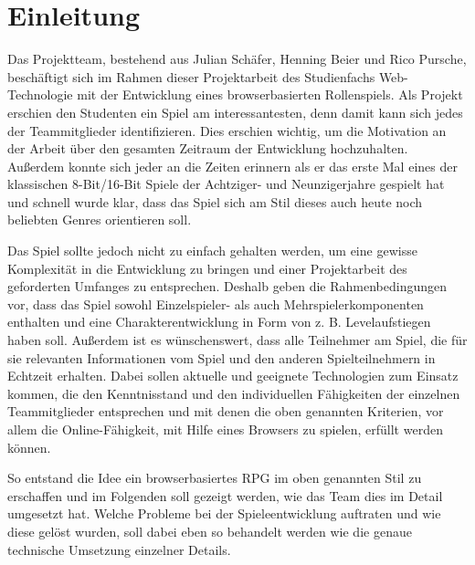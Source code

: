 

\section{Einleitung}

Das Projektteam, bestehend aus Julian Schäfer, Henning Beier und Rico Pursche, beschäftigt sich im Rahmen dieser Projektarbeit des Studienfachs Web-Technologie mit der Entwicklung eines browserbasierten Rollenspiels. 
Als Projekt erschien den Studenten ein Spiel am interessantesten, denn damit kann sich jedes der Teammitglieder identifizieren. Dies erschien wichtig, um die Motivation an der Arbeit über den gesamten Zeitraum der Entwicklung hochzuhalten. Außerdem konnte sich jeder an die Zeiten erinnern als er das erste Mal eines der klassischen 8-Bit/16-Bit Spiele der Achtziger- und Neunzigerjahre gespielt hat und schnell wurde klar, dass das Spiel sich am Stil dieses auch heute noch beliebten Genres orientieren soll.

Das Spiel sollte jedoch nicht zu einfach gehalten werden, um eine gewisse Komplexität in die Entwicklung zu bringen und einer Projektarbeit des geforderten Umfanges zu entsprechen. Deshalb geben die Rahmenbedingungen vor, dass das Spiel sowohl Einzelspieler- als auch Mehrspielerkomponenten enthalten und eine Charakterentwicklung in Form von z. B. Levelaufstiegen haben soll. Außerdem ist es wünschenswert, dass alle Teilnehmer am Spiel, die für sie relevanten Informationen vom Spiel und den anderen Spielteilnehmern in Echtzeit erhalten. Dabei sollen aktuelle und geeignete Technologien zum Einsatz kommen, die den Kenntnisstand und den individuellen Fähigkeiten der einzelnen Teammitglieder entsprechen und mit denen die oben genannten Kriterien, vor allem die Online-Fähigkeit, mit Hilfe eines Browsers zu spielen, erfüllt werden können. 

So entstand die Idee ein browserbasiertes RPG im oben genannten Stil zu erschaffen und im Folgenden soll gezeigt werden, wie das Team dies im Detail umgesetzt hat. Welche Probleme bei der Spieleentwicklung auftraten und wie diese gelöst wurden, soll dabei eben so behandelt werden wie die genaue technische Umsetzung einzelner Details.
